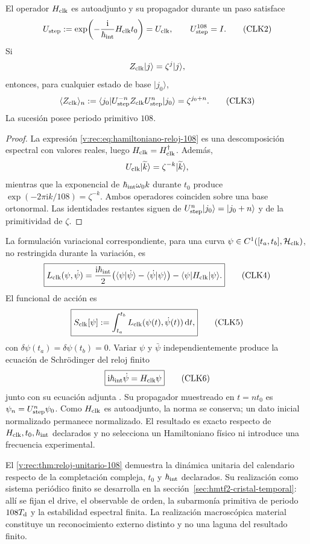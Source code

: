 \begin{theorem}
\label{v:rec:thm:reloj-unitario-108}
El operador \(H_{\rm clk}\) es autoadjunto y su propagador durante un paso
satisface
\[
 U_{\rm step}
 :=\exp\!\left(-\frac{\mathrm i}{\hbar_{\rm int}}
 H_{\rm clk}t_0\right)
 =U_{\rm clk},
 \qquad
 U_{\rm step}^{108}=I.
 \tag{CLK2}\label{v:rec:eq:propagador-reloj-108}
\]
Si
\[
 Z_{\rm clk}|j\rangle=\zeta^j|j\rangle,
\]
entonces, para cualquier estado de base \(|j_0\rangle\),
\[
 \langle Z_{\rm clk}\rangle_{n}
 :=\langle j_0|U_{\rm step}^{-n}Z_{\rm clk}
 U_{\rm step}^n|j_0\rangle
 =\zeta^{j_0+n}.
 \tag{CLK3}\label{v:rec:eq:respuesta-reloj-108}
\]
La sucesión posee periodo primitivo \(108\).
\end{theorem}

\begin{proof}
La expresión \eqref{v:rec:eq:hamiltoniano-reloj-108} es una descomposición
espectral con valores reales, luego \(H_{\rm clk}=H_{\rm clk}^\dagger\).
Además,
\[
 U_{\rm clk}|\widetilde k\rangle
 =\zeta^{-k}|\widetilde k\rangle,
\]
mientras que la exponencial de
\(\hbar_{\rm int}\omega_0 k\) durante \(t_0\) produce
\(\exp(-2\pi\mathrm ik/108)=\zeta^{-k}\). Ambos operadores coinciden sobre
una base ortonormal. Las identidades restantes siguen de
\(U_{\rm step}^n|j_0\rangle=|j_0+n\rangle\) y de la primitividad de
\(\zeta\).
\end{proof}

La formulación variacional correspondiente, para una curva
\(\psi\in C^1([t_a,t_b],\mathcal H_{\rm clk})\), no restringida durante la
variación, es
\[
 \boxed{
 L_{\rm clk}(\psi,\dot\psi)
 =\frac{\mathrm i\hbar_{\rm int}}2
 \bigl(
 \langle\psi|\dot\psi\rangle
 -\langle\dot\psi|\psi\rangle
 \bigr)
 -\langle\psi|H_{\rm clk}|\psi\rangle.}
 \tag{CLK4}\label{v:rec:eq:lagrangiano-reloj-108}
\]
El funcional de acción es
\[
 \boxed{
 S_{\rm clk}[\psi]
 :=\int_{t_a}^{t_b}
 L_{\rm clk}(\psi(t),\dot\psi(t))\,\mathrm dt,}
 \tag{CLK5}\label{v:rec:eq:accion-reloj-108}
\]
con \(\delta\psi(t_a)=\delta\psi(t_b)=0\).
Variar \(\psi\) y \(\bar\psi\) independientemente produce la ecuación de
Schrödinger del reloj finito
\[
 \boxed{\mathrm i\hbar_{\rm int}\dot\psi=H_{\rm clk}\psi}
 \tag{CLK6}\label{v:rec:eq:schrodinger-reloj-108}
\]
junto con su ecuación adjunta \cite{SchrodingerNobel}. Su propagador muestreado
en \(t=nt_0\) es \(\psi_n=U_{\rm step}^{n}\psi_0\). Como \(H_{\rm clk}\) es
autoadjunto, la norma se conserva; un dato inicial normalizado permanece
normalizado. El resultado es exacto respecto de
\(H_{\rm clk},t_0,\hbar_{\rm int}\) declarados y no selecciona un Hamiltoniano
físico ni introduce una frecuencia experimental.

El \cref{v:rec:thm:reloj-unitario-108} demuestra la dinámica unitaria del calendario
respecto de la completación compleja, \(t_0\) y \(\hbar_{\rm int}\)
declarados. Su realización como sistema periódico finito se desarrolla
en la sección~\ref{sec:hmtf2-cristal-temporal}: allí se
fijan el drive, el observable de orden, la subarmonía primitiva de periodo
\(108T_{\rm d}\) y la estabilidad espectral finita. La realización
macroscópica material constituye un reconocimiento externo distinto y no una
laguna del resultado finito.
